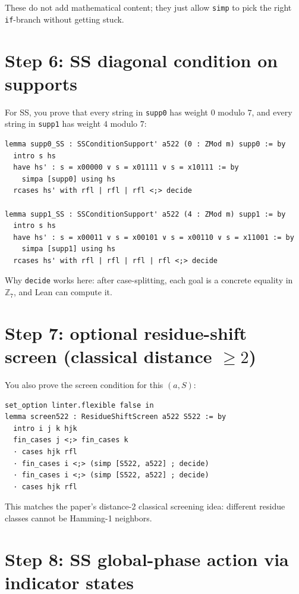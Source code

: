 \documentclass[11pt]{article}
\begin{document}
These do not add mathematical content; they just allow \texttt{simp} to pick the right \texttt{if}-branch without getting stuck.

\section*{Step 6: SS diagonal condition on supports}

For SS, you prove that every string in \texttt{supp0} has weight \(0\) modulo \(7\), and every string in \texttt{supp1} has weight \(4\) modulo \(7\):

\begin{lstlisting}
lemma supp0_SS : SSConditionSupport' a522 (0 : ZMod m) supp0 := by
  intro s hs
  have hs' : s = x00000 ∨ s = x01111 ∨ s = x10111 := by
    simpa [supp0] using hs
  rcases hs' with rfl | rfl | rfl <;> decide

lemma supp1_SS : SSConditionSupport' a522 (4 : ZMod m) supp1 := by
  intro s hs
  have hs' : s = x00011 ∨ s = x00101 ∨ s = x00110 ∨ s = x11001 := by
    simpa [supp1] using hs
  rcases hs' with rfl | rfl | rfl | rfl <;> decide
\end{lstlisting}

Why \texttt{decide} works here: after case-splitting, each goal is a concrete equality in \(\mathbb{Z}_7\), and Lean can compute it.

\section*{Step 7: optional residue-shift screen (classical distance \(\ge 2\))}

You also prove the screen condition for this \((a,S)\):

\begin{lstlisting}
set_option linter.flexible false in
lemma screen522 : ResidueShiftScreen a522 S522 := by
  intro i j k hjk
  fin_cases j <;> fin_cases k
  · cases hjk rfl
  · fin_cases i <;> (simp [S522, a522] ; decide)
  · fin_cases i <;> (simp [S522, a522] ; decide)
  · cases hjk rfl
\end{lstlisting}

This matches the paper's distance-2 classical screening idea: different residue classes cannot be Hamming-1 neighbors.

\section*{Step 8: SS global-phase action via indicator states}
\end{document}
